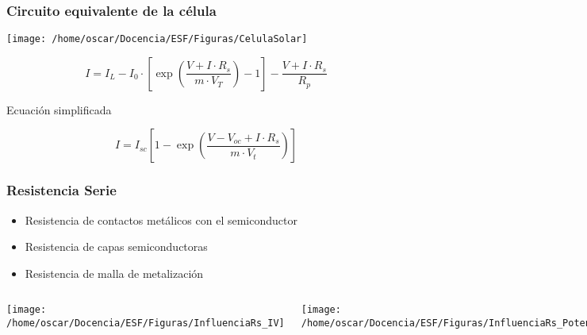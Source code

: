 \documentclass[xcolor=dvipsnames]{beamer}
\begin{document}
\begin{frame}
  \frametitle{Circuito equivalente de la célula}

  \begin{center}
    \texttt{[image: /home/oscar/Docencia/ESF/Figuras/CelulaSolar]}
    \par\end{center}

\[
I=I_{L}-I_{0}\cdot[\exp(\frac{V+I\cdot R_{s}}{m\cdot
  V_{T}})-1]-\frac{V+I\cdot R_{s}}{R_{p}}\]

\begin{block} {Ecuación simplificada}

\[
I=I_{sc}[1-\exp(\frac{V-V_{oc}+I\cdot R_{s}}{m\cdot V_{t}})]\]


\end{block}

\end{frame}

\begin{frame}
  \frametitle{Resistencia Serie}
  \begin{block} {}
    \begin{itemize}
    \item Resistencia de contactos metálicos con el semiconductor
    \item Resistencia de capas semiconductoras
    \item Resistencia de malla de metalización
    \end{itemize}
  \end{block}
  \begin{columns}[t]


    \column{6cm}

    \texttt{[image: /home/oscar/Docencia/ESF/Figuras/InfluenciaRs\_IV]}


    \column{6cm}

    \texttt{[image: /home/oscar/Docencia/ESF/Figuras/InfluenciaRs\_Potencia]}

  \end{columns}

\end{frame}
\end{document}
